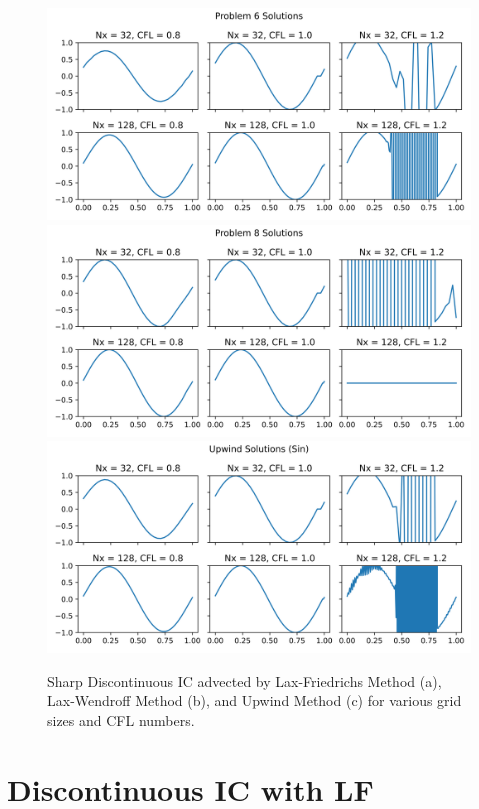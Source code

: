 \documentclass{article}
\begin{document}
\begin{figure}[t]
    \centering
    \includegraphics[width=.6\textwidth]{../code/prob6_tstop.png}
    \includegraphics[width=.6\textwidth]{../code/prob8_tstop.png}
    \includegraphics[width=.6\textwidth]{../code/upwind_sin_tstop.png}
    \caption{Sharp Discontinuous IC advected by Lax-Friedrichs Method (a),
    Lax-Wendroff Method (b), and Upwind Method (c) for various grid sizes and
    CFL numbers.}
    \label{fig:sin_adv}
\end{figure}

\section{Discontinuous IC with LF}
\end{document}
